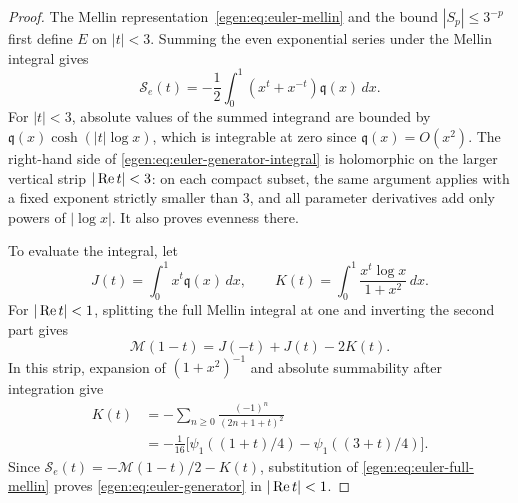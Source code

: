 \begin{proof}
The Mellin representation~\eqref{egen:eq:euler-mellin} and the bound \(|S_p|\le3^{-p}\)
first define \(E\) on \(|t|<3\). Summing the even exponential
series under the Mellin integral gives
\begin{equation}
\mathcal S_e(t)=-\frac12\int_0^1(x^t+x^{-t})\mathfrak q(x)\,dx.
\label{egen:eq:euler-generator-integral}
\end{equation}
For \(|t|<3\), absolute values of the summed integrand are bounded
by \(\mathfrak q(x)\cosh(|t|\log x)\), which is integrable at zero since
\(\mathfrak q(x)=O(x^2)\). The right-hand side of
\eqref{egen:eq:euler-generator-integral} is holomorphic on the larger
vertical strip \(|\operatorname{Re} t|<3\): on each compact subset, the same
argument applies with a fixed exponent strictly smaller than \(3\),
and all parameter derivatives add only powers of \(|\log x|\).
It also proves evenness there.

To evaluate the integral, let
\[
J(t)=\int_0^1x^t\mathfrak q(x)\,dx,
\qquad
K(t)=\int_0^1\frac{x^t\log x}{1+x^2}\,dx.
\]
For \(|\operatorname{Re} t|<1\), splitting the full Mellin integral at one
and inverting the second part gives
\[
\mathcal M(1-t)=J(-t)+J(t)-2K(t).
\]
In this strip, expansion of \((1+x^2)^{-1}\) and absolute
summability after integration give
\begin{align*}
K(t)
&=-\sum_{n\ge0}\frac{(-1)^n}{(2n+1+t)^2}\\
&=-\frac1{16}
 \bigl[\psi_1((1+t)/4)-\psi_1((3+t)/4)\bigr].
\end{align*}
Since \(\mathcal S_e(t)=-\mathcal M(1-t)/2-K(t)\), substitution of
\eqref{egen:eq:euler-full-mellin} proves
\eqref{egen:eq:euler-generator} in \(|\operatorname{Re} t|<1\).


\end{proof}
